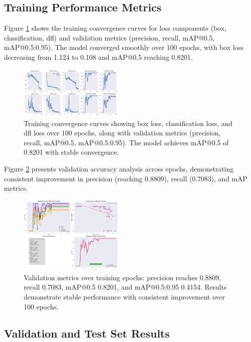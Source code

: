 \documentclass[conference]{IEEEtran}
\begin{document}
\subsection{Training Performance Metrics}

Figure \ref{fig:training_results} shows the training convergence curves for loss components (box, classification, dfl) and validation metrics (precision, recall, mAP@0.5, mAP@0.5:0.95). The model converged smoothly over 100 epochs, with box loss decreasing from 1.124 to 0.108 and mAP@0.5 reaching 0.8201.

\begin{figure}[htbp]
\centerline{\includegraphics[width=0.45\textwidth]{training_results.png}}
\caption{Training convergence curves showing box loss, classification loss, and dfl loss over 100 epochs, along with validation metrics (precision, recall, mAP@0.5, mAP@0.5:0.95). The model achieves mAP@0.5 of 0.8201 with stable convergence.}
\label{fig:training_results}
\end{figure}

Figure \ref{fig:validation_curves} presents validation accuracy analysis across epochs, demonstrating consistent improvement in precision (reaching 0.8809), recall (0.7083), and mAP metrics.

\begin{figure}[htbp]
\centerline{\includegraphics[width=0.45\textwidth]{validation_curves.png}}
\caption{Validation metrics over training epochs: precision reaches 0.8809, recall 0.7083, mAP@0.5 0.8201, and mAP@0.5:0.95 0.4154. Results demonstrate stable performance with consistent improvement over 100 epochs.}
\label{fig:validation_curves}
\end{figure}

\subsection{Validation and Test Set Results}
\end{document}
